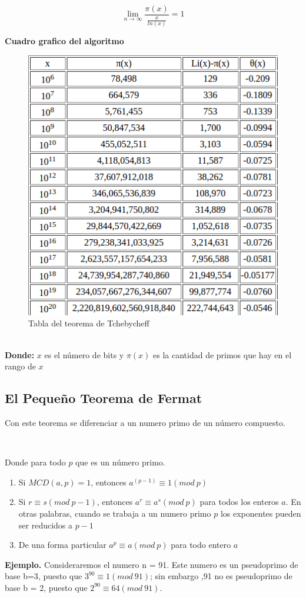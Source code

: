 \documentclass[11pt, conference]{IEEEtran}
\begin{document}
	\[
	\lim_{n \to \infty} \frac{\pi(x)}{\frac{x}{ln(x)}}=1
	\]

\textbf{Cuadro grafico del algoritmo}
\begin{figure}[h]
	\begin{center}
		\includegraphics[scale=0.5]{6.png}
		\caption{Tabla del teorema de Tchebycheff} 
	\end{center}
\end{figure}\\
\textbf{Donde:}
$x$ es el número de bits y $\pi(x)$ es la cantidad de primos que hay en el rango de $x$\\


\subsection{El Pequeño Teorema de Fermat}
Con este teorema se diferenciar a un numero primo de un número compuesto.\cite{c}

\

Donde para todo $p$ que es un número primo.
\begin{enumerate}
	\item Si $MCD(a, p) = 1$, entonces $a^{(p-1)}\equiv1(mod\ p)$ 
	\item Si $r\equiv s(mod\ p-1)$, entonces $a^r\equiv a^{s}(mod\ p)$ para todos los enteros $a$. En otras palabras, cuando se trabaja a un numero primo $p$ los exponentes pueden ser reducidos a $p-1$
	\item De una forma particular $a^p\equiv a(mod\ p)$ para todo entero $a$
\end{enumerate}
\textbf{Ejemplo.} Consideraremos el numero n = 91. Este numero es un pseudoprimo de base b=3, puesto que $3^{90}\equiv 1(mod\ 91)$; sin embargo ,91 no es pseudoprimo de base b = 2, puesto que $2^{90}\equiv 64(mod\ 91)$.
 
\end{document}
